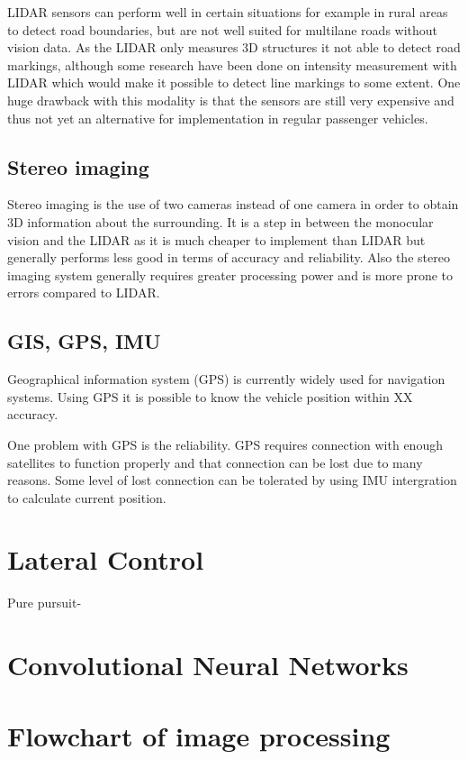 LIDAR sensors can perform well in certain situations for example in rural areas to detect road boundaries, \cite{BarHillel2014} but are not well suited for multilane roads without vision data. As the LIDAR only measures 3D structures it not able to detect road markings, although some research have been done on intensity measurement with LIDAR \cite{huang2009finding} \cite{kammel2008lidar} which would make it possible to detect line markings to some extent. One huge drawback with this modality is that the sensors are still very expensive and thus not yet an alternative for implementation in regular passenger vehicles.

\subsection{Stereo imaging}
Stereo imaging is the use of two cameras instead of one camera in order to obtain 3D information about the surrounding. It is a step in between the monocular vision and the LIDAR as it is much cheaper to implement than LIDAR but generally performs less good in terms of accuracy and reliability.  Also the stereo imaging system generally requires greater processing power and is more prone to errors compared to LIDAR. 


\subsection{GIS, GPS, IMU}
Geographical information system (GPS) is currently widely used for navigation systems. Using GPS it is possible to know the vehicle position within XX accuracy. 

One problem with GPS is the reliability. GPS requires connection with enough satellites to function properly and that connection can be lost due to many reasons. Some level of lost connection can be tolerated by using IMU intergration to calculate current position. 



\section{Lateral Control}
Pure pursuit-
\section{Convolutional Neural Networks}


\section{Flowchart of image processing}

